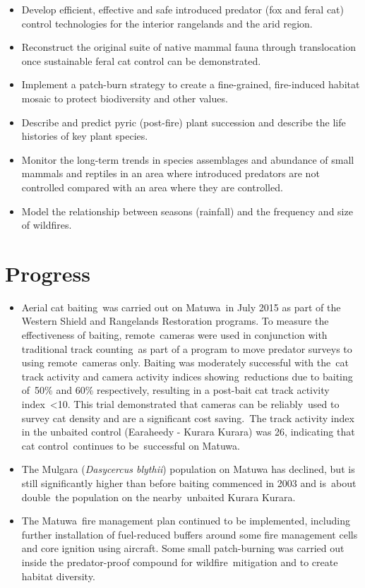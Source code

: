 \documentclass[version=last,
    paper=a4, %
    10pt, %
    usenames,
    dvipsnames,
    oneside, %
    headings=openany, %
    DIV=15 %
]{scrbook}
\begin{document}
\begin{itemize}
\itemsep1pt\parskip0pt
\item
  Develop efficient, effective and safe introduced predator (fox and
  feral cat) control technologies for the interior rangelands and the
  arid region.
\item
  Reconstruct the original suite of native mammal fauna through
  translocation once sustainable feral cat control can be demonstrated.
\item
  Implement a patch-burn strategy to create a fine-grained, fire-induced
  habitat mosaic to protect biodiversity and other values.
\item
  Describe and predict pyric (post-fire) plant succession and describe
  the life histories of key plant species.
\item
  Monitor the long-term trends in species assemblages and abundance of
  small mammals and reptiles in an area where introduced predators are
  not controlled compared with an area where they are controlled.
\item
  Model the relationship between seasons (rainfall) and the frequency
  and size of wildfires.
\end{itemize}




\section*{Progress}

\begin{itemize}
\itemsep1pt\parskip0pt
\item
  Aerial cat baiting~was carried out on Matuwa~in July 2015 as part of
  the Western Shield and Rangelands Restoration programs. To measure the
  effectiveness of baiting, remote~cameras were used in conjunction with
  traditional track counting~as part of a program to move predator
  surveys to using remote~cameras only. Baiting was moderately
  successful with the~cat track activity and camera activity indices
  showing~reductions due to baiting of~50\% and 60\% respectively,
  resulting in a post-bait cat track activity index~\textless{}10. This
  trial demonstrated that cameras can be reliably~used to survey cat
  density and are a significant cost saving.~The track activity index in
  the unbaited control (Earaheedy - Kurara Kurara) was 26, indicating
  that cat control~continues to be~successful on Matuwa.
\item
  The Mulgara (\emph{Dasycercus blythii}) population on Matuwa has
  declined, but is still significantly higher than before baiting
  commenced in 2003 and is~about double~the population on the
  nearby~unbaited Kurara Kurara.
\item
  The Matuwa~fire management plan continued to be implemented, including
  further installation of fuel-reduced buffers around some fire
  management cells and core ignition using aircraft. Some small
  patch-burning was carried out inside the predator-proof compound for
  wildfire~mitigation and to create habitat diversity.~
\end{itemize}
\end{document}
